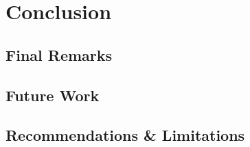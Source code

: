\clearpage
\chapter{Conclusion}

\section{Final Remarks}

\section{Future Work}

\section{Recommendations \& Limitations}